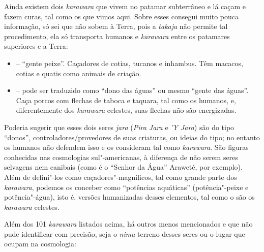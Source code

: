 Ainda existem dois \emph{karawara} que vivem no patamar subterrâneo e lá
caçam e fazem curas, tal como os que vimos aqui. Sobre esses consegui
muito pouca informação, só sei que não sobem à Terra, pois a
\emph{takaja} não permite tal procedimento, ela só transporta humanos e
\emph{karawara} entre os patamares superiores e a Terra:

\begin{itemize}
\item
  \emph{} -- ``gente peixe''. Caçadores de cotias,
  tucanos e inhambus. Têm macacos, cotias e quatis como animais de
  criação. 
\item
  \emph{} -- pode ser traduzido como ``dono das águas'' ou
  mesmo ``gente das águas''. Caça porcos com flechas de taboca e
  taquara, tal como os humanos, e, diferentemente dos \emph{karawara}
  celestes, suas flechas não são energizadas.
\end{itemize}

Poderia sugerir que esses dois seres \emph{jara} (\emph{Pira Jara} e
\emph{'Y Jara}) são do tipo ``donos'', controladores/provedores de suas
criaturas, ou ideias do tipo; no entanto os humanos não defendem isso e
os consideram tal como \emph{karawara}. São figuras conhecidas nas
cosmologias sul"-americanas, à diferença de não serem seres selvagens nem
canibais (como é o ``Senhor da Água'' Araweté, por exemplo). Além de
defini"-los como caçadores"-magníficos, tal como grande parte dos
\emph{karawara}, podemos os conceber como ``potências aquáticas''
(potência"-peixe e potência"-água), isto é, versões humanizadas desses
elementos, tal como o são os \emph{karawara} celestes.

Além dos 101 \emph{karawara} listados acima, há outros menos mencionados
e que não pude identificar com precisão, seja o \emph{nima} terreno
desses seres ou o lugar que ocupam na cosmologia:

